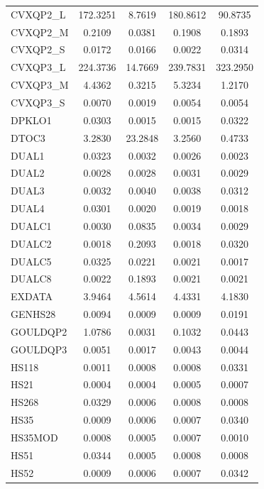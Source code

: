 \begin{longtable}{lcccc}
CVXQP2\_L & 172.3251 &   8.7619 &   180.8612 &  90.8735 \\
CVXQP2\_M &   0.2109 &   0.0381 &     0.1908 &   0.1893 \\
CVXQP2\_S &   0.0172 &   0.0166 &     0.0022 &   0.0314 \\
CVXQP3\_L & 224.3736 &  14.7669 &   239.7831 & 323.2950 \\
CVXQP3\_M &   4.4362 &   0.3215 &     5.3234 &   1.2170 \\
CVXQP3\_S &   0.0070 &   0.0019 &     0.0054 &   0.0054 \\
DPKLO1   &   0.0303 &   0.0015 &     0.0015 &   0.0322 \\
DTOC3    &   3.2830 &  23.2848 &     3.2560 &   0.4733 \\
DUAL1    &   0.0323 &   0.0032 &     0.0026 &   0.0023 \\
DUAL2    &   0.0028 &   0.0028 &     0.0031 &   0.0029 \\
DUAL3    &   0.0032 &   0.0040 &     0.0038 &   0.0312 \\
DUAL4    &   0.0301 &   0.0020 &     0.0019 &   0.0018 \\
DUALC1   &   0.0030 &   0.0835 &     0.0034 &   0.0029 \\
DUALC2   &   0.0018 &   0.2093 &     0.0018 &   0.0320 \\
DUALC5   &   0.0325 &   0.0221 &     0.0021 &   0.0017 \\
DUALC8   &   0.0022 &   0.1893 &     0.0021 &   0.0021 \\
EXDATA   &   3.9464 &   4.5614 &     4.4331 &   4.1830 \\
GENHS28  &   0.0094 &   0.0009 &     0.0009 &   0.0191 \\
GOULDQP2 &   1.0786 &   0.0031 &     0.1032 &   0.0443 \\
GOULDQP3 &   0.0051 &   0.0017 &     0.0043 &   0.0044 \\
HS118    &   0.0011 &   0.0008 &     0.0008 &   0.0331 \\
HS21     &   0.0004 &   0.0004 &     0.0005 &   0.0007 \\
HS268    &   0.0329 &   0.0006 &     0.0008 &   0.0008 \\
HS35     &   0.0009 &   0.0006 &     0.0007 &   0.0340 \\
HS35MOD  &   0.0008 &   0.0005 &     0.0007 &   0.0010 \\
HS51     &   0.0344 &   0.0005 &     0.0008 &   0.0008 \\
HS52     &   0.0009 &   0.0006 &     0.0007 &   0.0342 \\

\end{longtable}
